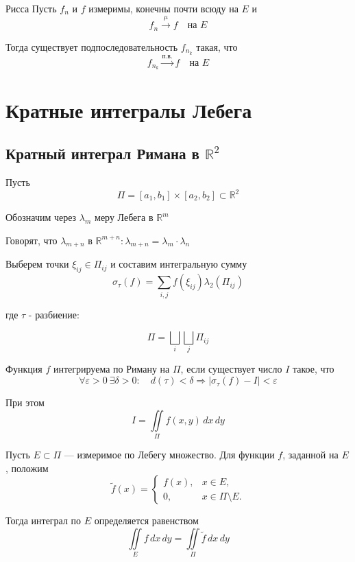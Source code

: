 \documentclass[12pt,a4paper]{article}
\begin{document}
\begin{theorem}{Рисса}
    Пусть $f_n$ и $f$ измеримы, конечны почти всюду на $E$ и
    \[
        f_n\xrightarrow{\mu}f \quad \text{на } E
    \]

    Тогда существует подпоследовательность $f_{n_k}$ такая, что
    \[
        f_{n_k}\xrightarrow{\text{п.в.}}f
        \quad \text{на }E
    \]
\end{theorem}

\newpage

\section{Кратные интегралы Лебега}

\subsection{Кратный интеграл Римана в \texorpdfstring{$\mathbb R^2$}{R²}}

Пусть
\[
    \Pi=[a_1,b_1]\times[a_2,b_2]\subset\mathbb R^2
\]

Обозначим через $\lambda_m$ меру Лебега в $\mathbb R^m$

\begin{note}
    Говорят, что $\lambda_{m + n}$ в $\mathbb{R}^{m+n} : \lambda_{m + n} = \lambda_m \cdot \lambda_n$
\end{note}

Выберем точки $\xi_{ij}\in\Pi_{ij}$ и составим
интегральную сумму
\[
    \sigma_\tau(f)
    =\sum_{i,j}f(\xi_{ij})\lambda_2(\Pi_{ij})
\]

где $\tau$ - разбиение:

\[
    \Pi = \bigsqcup_i \bigsqcup_j \Pi_{ij}
\]

Функция $f$ интегрируема по Риману на $\Pi$, если существует
число $I$ такое, что
\[
    \forall\varepsilon>0\ \exists\delta>0:
    \quad
    d(\tau)<\delta
    \Longrightarrow
    |\sigma_\tau(f)-I|<\varepsilon
\]

При этом
\[
    I=\iint\limits_\Pi f(x,y)\,dx\,dy
\]

\begin{definition}
    Пусть $E\subset\Pi$ --- измеримое по Лебегу множество.
    Для функции $f$, заданной на $E$, положим
    \[
        \widetilde f(x)=
        \begin{cases}
            f(x), & x\in E,\\
            0, & x\in\Pi\setminus E.
        \end{cases}
    \]

    Тогда интеграл по $E$ определяется равенством
    \[
        \iint\limits_E f\,dx\,dy
        =
        \iint\limits_\Pi\widetilde f\,dx\,dy
    \]
\end{definition}
\end{document}
